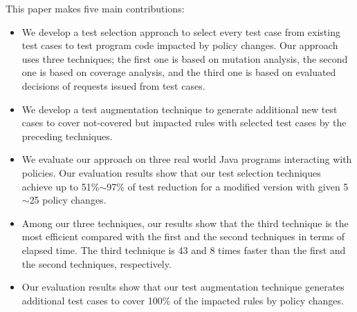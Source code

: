 





This paper makes five main contributions:

\begin{itemize}
  \item We develop a test selection approach to select every test case from existing test cases to test program code impacted by policy changes. Our approach
  uses three techniques; the first one is based on mutation analysis, the second one is based on coverage analysis, and the third one is based on evaluated 
decisions of requests issued from test cases. 
  \item We develop a test augmentation technique to generate additional new test cases to cover not-covered but impacted rules with selected test cases by the preceding techniques.

  \item We evaluate our approach on three real world Java programs interacting with policies. Our evaluation results show that our test selection techniques achieve
 up to 51\%$\sim$97\% of test reduction for a modified version with given 5$\sim$25 policy changes.
  

  \item Among our three techniques, our results show that the third technique is the most efficient compared with the first
  and the second techniques in terms of elapsed time. The third technique is 43 and 8 times
faster than the first and the second techniques, respectively.
  
  \item Our evaluation results show that our test augmentation technique generates additional test cases to cover 100\% of the impacted rules by policy changes.
\end{itemize}


